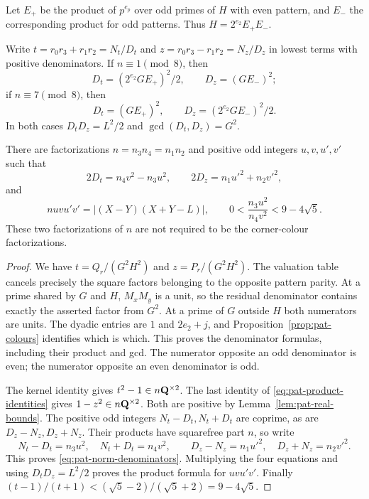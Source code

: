 Let $E_+$ be the product of $p^{e_p}$ over odd primes of $H$
with even pattern, and $E_-$ the corresponding product for odd
patterns.  Thus $H=2^{e_2}E_+E_-$.

\begin{theorem}
\label{thm:pat-product-denominators}
Write $t=r_0r_3+r_1r_2=N_t/D_t$ and
$z=r_0r_3-r_1r_2=N_z/D_z$ in lowest terms with positive
denominators.  If $n\equiv1\pmod8$, then
\[
 D_t=(2^{e_2}GE_+)^2/2,\qquad D_z=(GE_-)^2;
\]
if $n\equiv7\pmod8$, then
\[
 D_t=(GE_+)^2,\qquad D_z=(2^{e_2}GE_-)^2/2.
\]
In both cases $D_tD_z=L^2/2$ and $\gcd(D_t,D_z)=G^2$.

There are factorizations $n=n_3n_4=n_1n_2$ and positive odd
integers $u,v,u',v'$ such that
\begin{equation}
 2D_t=n_4v^2-n_3u^2,\qquad
 2D_z=n_1u'^2+n_2v'^2,
 \label{eq:pat-norm-denominators}
\end{equation}
and
\[
 n u v u'v'=|(X-Y)(X+Y-L)|,\qquad
 0<\frac{n_3u^2}{n_4v^2}<9-4\sqrt5.
\]
These two factorizations of $n$ are not required to be the
corner-colour factorizations.
\end{theorem}

\begin{proof}
We have $t=Q_r/(G^2H^2)$ and $z=P_r/(G^2H^2)$.
The valuation table cancels precisely the square factors belonging
to the opposite pattern parity.  At a prime shared by $G$ and $H$,
$M_xM_y$ is a unit, so the residual denominator contains exactly
the asserted factor from $G^2$.  At a prime of $G$ outside $H$
both numerators are units.  The dyadic entries are $1$ and
$2e_2+j$, and Proposition~\ref{prop:pat-colours} identifies
which is which.  This proves the denominator formulas, including
their product and gcd.  The numerator opposite an odd denominator
is even; the numerator opposite an even denominator is odd.

The kernel identity gives $t^2-1\in n\mathbf Q^{\times2}$.
The last identity of \eqref{eq:pat-product-identities} gives
$1-z^2\in n\mathbf Q^{\times2}$.  Both are positive by
Lemma~\ref{lem:pat-real-bounds}.  The positive odd integers
$N_t-D_t,N_t+D_t$ are coprime, as are
$D_z-N_z,D_z+N_z$.  Their products have squarefree part $n$,
so write
\[
 N_t-D_t=n_3u^2,\quad N_t+D_t=n_4v^2,\qquad
 D_z-N_z=n_1u'^2,\quad D_z+N_z=n_2v'^2.
\]
This proves \eqref{eq:pat-norm-denominators}.
Multiplying the four equations and using $D_tD_z=L^2/2$
proves the product formula for $uv u'v'$.
Finally $(t-1)/(t+1)<(\sqrt5-2)/(\sqrt5+2)=9-4\sqrt5$.
\end{proof}

